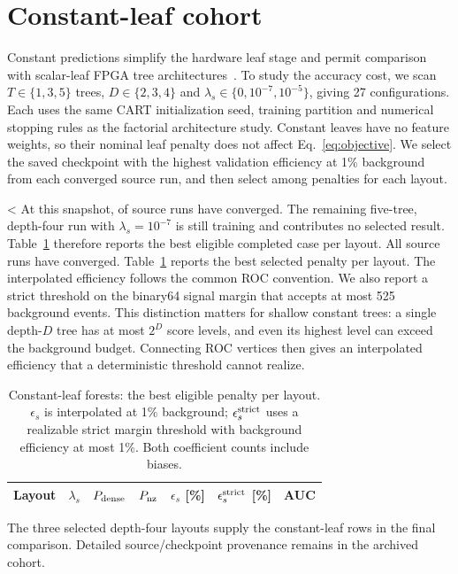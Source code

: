 \section{Constant-leaf cohort}
\label{app:constant}
\label{sec:constant}
Constant predictions simplify the hardware leaf stage and permit comparison
with scalar-leaf FPGA tree architectures~\cite{conifer2020}. To study the
accuracy cost, we scan $T\in\{1,3,5\}$ trees, $D\in\{2,3,4\}$ and
$\lambda_s\in\{0,10^{-7},10^{-5}\}$, giving 27 configurations. Each uses the
same CART initialization seed, training partition and numerical stopping rules
as the factorial architecture study. Constant leaves have no feature weights,
so their nominal leaf penalty does not affect Eq.~\eqref{eq:objective}.
We select the saved checkpoint with the highest validation efficiency at
1\% background from each converged source run, and then select among
penalties for each layout.

\ifnum\ConstantCompleted<\ConstantTotal\relax
At this snapshot, \ConstantCompleted{} of \ConstantTotal{} source runs have
converged. The remaining five-tree, depth-four run with $\lambda_s=10^{-7}$
is still training and contributes no selected result. Table~\ref{tab:constant}
therefore reports the best eligible completed case per layout.
\else
All \ConstantTotal{} source runs have converged.
Table~\ref{tab:constant} reports the best selected penalty per layout.
\fi
The interpolated efficiency follows the common ROC convention. We also report
a strict threshold on the binary64 signal margin that accepts at most 525
background events. This distinction matters for shallow constant trees:
a single depth-$D$ tree has at most $2^D$ score levels, and even its highest
level can exceed the background budget. Connecting ROC vertices then gives
an interpolated efficiency that a deterministic threshold cannot realize.

\begin{table}[htbp]\centering\small
\caption{Constant-leaf forests: the best eligible penalty per layout.
$\epsilon_s$ is interpolated at 1\% background; $\epsilon_s^{\rm strict}$ uses
a realizable strict margin threshold with background efficiency at most 1\%.
Both coefficient counts include biases.}
\label{tab:constant}\setlength{\tabcolsep}{4pt}
\begin{tabular}{@{}lrrrrrr@{}}\toprule
Layout & $\lambda_s$ & $P_{\rm dense}$ & $P_{\rm nz}$ & $\epsilon_s$ [\%] & $\epsilon_s^{\rm strict}$ [\%] & AUC\\\midrule
\end{tabular}
\end{table}

The three selected depth-four layouts supply the constant-leaf rows in the final
comparison. Detailed source/checkpoint provenance remains in the archived cohort.
